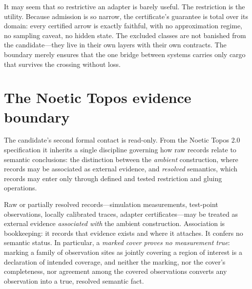 \begin{remark}\label{ch09:rem:asset}
It may seem that so restrictive an adapter is barely useful. The restriction is the utility. Because admission is so narrow, the certificate's guarantee is total over its domain: every certified arrow is exactly faithful, with no approximation regime, no sampling caveat, no hidden state. The excluded classes are not banished from the candidate---they live in their own layers with their own contracts. The boundary merely ensures that the one bridge between systems carries only cargo that survives the crossing without loss.
\end{remark}

\section{The Noetic Topos evidence boundary}\label{ch09:sec:topos}

The candidate's second formal contact is read-only. From the Noetic Topos 2.0 specification it inherits a single discipline governing how raw records relate to semantic conclusions: the distinction between the \emph{ambient} construction, where records may be associated as external evidence, and \emph{resolved} semantics, which records may enter only through defined and tested restriction and gluing operations.

\begin{ruleenv}\label{ch09:rule:ambient}
Raw or partially resolved records---simulation measurements, test-point observations, locally calibrated traces, adapter certificates---may be treated as external evidence \emph{associated with} the ambient construction. Association is bookkeeping: it records that evidence exists and where it attaches. It confers no semantic status. In particular, a \emph{marked cover proves no measurement true}: marking a family of observation sites as jointly covering a region of interest is a declaration of intended coverage, and neither the marking, nor the cover's completeness, nor agreement among the covered observations converts any observation into a true, resolved semantic fact.
\end{ruleenv}

